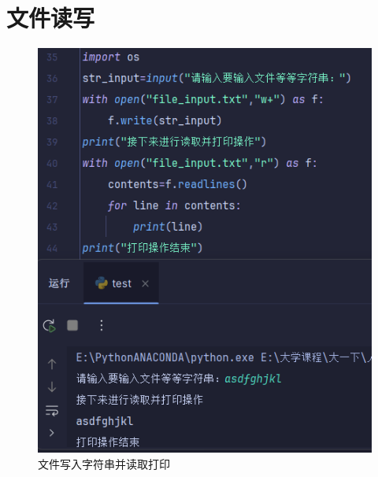 \documentclass[10pt]{article}
\begin{document}
\section{文件读写}
	\begin{figure}[H]
		\centering
		\includegraphics[scale=1]{文件读写}
		\caption{文件写入字符串并读取打印}
	\end{figure}
\end{document}
